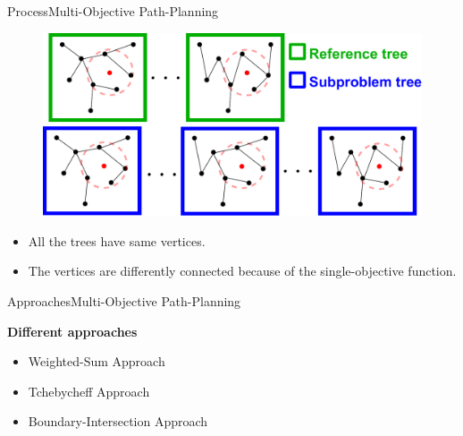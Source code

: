 \begin{frame}{Process}{Multi-Objective Path-Planning}
	\begin{figure}
		\centering
		\includegraphics[width=.7\linewidth]{figure/morrf.pdf}
		\label{fig:morrt:process}
	\end{figure}
	\begin{itemize}
		\item All the trees have same vertices.
		\item The vertices are differently connected because of the single-objective function.
	\end{itemize}
	
\end{frame}

\begin{frame}{Approaches}{Multi-Objective Path-Planning}
	
	{\bf Different approaches}
	
	\begin{itemize}
		\item
		\begin{minipage}{0.5\textwidth}
			\begin{block}{}
				\centering
				Weighted-Sum Approach
			\end{block}
		\end{minipage}
		\item
		\begin{minipage}{0.5\textwidth}
			\begin{block}{}
				\centering
				Tchebycheff Approach
			\end{block}
		\end{minipage}
		\item
		\begin{minipage}{0.5\textwidth}
			\begin{block}{}
				\centering
				Boundary-Intersection Approach
			\end{block}
		\end{minipage}
	\end{itemize}
	
	
\end{frame}

